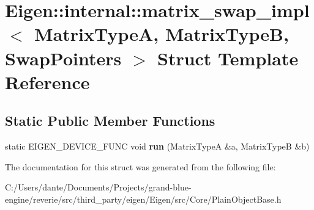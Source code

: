 \hypertarget{struct_eigen_1_1internal_1_1matrix__swap__impl}{}\section{Eigen\+::internal\+::matrix\+\_\+swap\+\_\+impl$<$ Matrix\+TypeA, Matrix\+TypeB, Swap\+Pointers $>$ Struct Template Reference}
\label{struct_eigen_1_1internal_1_1matrix__swap__impl}
\subsection*{Static Public Member Functions}
\begin{DoxyCompactItemize}
\item 
\mbox{\label{struct_eigen_1_1internal_1_1matrix__swap__impl_ae122306ad0aa65fcf0a8bf5e421179db}} 
static E\+I\+G\+E\+N\+\_\+\+D\+E\+V\+I\+C\+E\+\_\+\+F\+U\+NC void {\bfseries run} (Matrix\+TypeA \&a, Matrix\+TypeB \&b)
\end{DoxyCompactItemize}


The documentation for this struct was generated from the following file\+:\begin{DoxyCompactItemize}
\item 
C\+:/\+Users/dante/\+Documents/\+Projects/grand-\/blue-\/engine/reverie/src/third\+\_\+party/eigen/\+Eigen/src/\+Core/Plain\+Object\+Base.\+h\end{DoxyCompactItemize}
